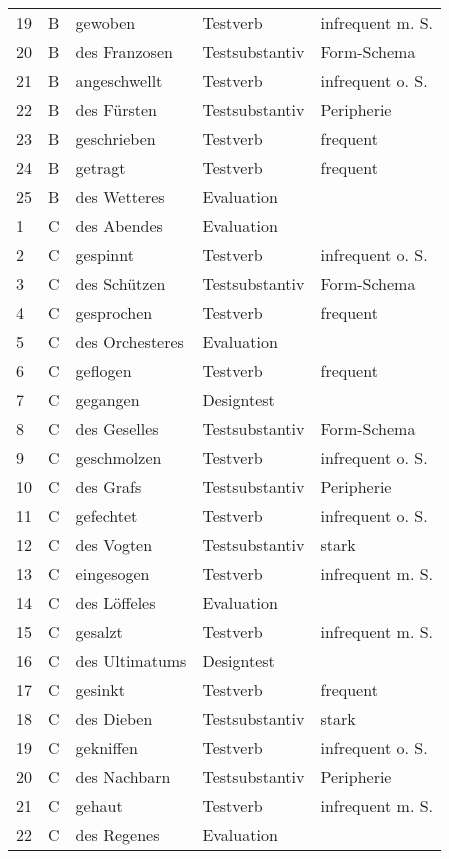 \begin{small}
\begin{longtable}{lllll}
  19 & B & gewoben & Testverb & infrequent m. S. \\ 
   20 & B & des Franzosen & Testsubstantiv & Form-Schema \\ 
   21 & B & angeschwellt & Testverb & infrequent o. S. \\ 
  22 & B & des Fürsten & Testsubstantiv & Peripherie \\ 
   23 & B & geschrieben & Testverb & frequent \\ 
  24 & B & getragt & Testverb & frequent \\ 
  25 & B & des Wetteres & Evaluation &  \\ 
	\midrule
  1 & C & des Abendes & Evaluation &  \\ 
 2 & C & gespinnt & Testverb & infrequent o. S. \\ 
   3 & C & des Schützen & Testsubstantiv & Form-Schema \\ 
   4 & C & gesprochen & Testverb & frequent \\ 
  5 & C & des Orchesteres & Evaluation &  \\ 
  6 & C & geflogen & Testverb & frequent \\ 
 7 & C & gegangen & Designtest &  \\ 
  8 & C & des Geselles & Testsubstantiv & Form-Schema \\ 
 9 & C & geschmolzen & Testverb & infrequent o. S. \\ 
  10 & C & des Grafs & Testsubstantiv & Peripherie \\ 
  11 & C & gefechtet & Testverb & infrequent o. S. \\ 
  12 & C & des Vogten & Testsubstantiv & stark \\ 
   13 & C & eingesogen & Testverb & infrequent m. S. \\ 
\midrule
14 & C & des Löffeles & Evaluation &  \\ 
  15 & C & gesalzt & Testverb & infrequent m. S. \\ 
 16 & C & des Ultimatums & Designtest &  \\ 
   17 & C & gesinkt & Testverb & frequent \\ 
   18 & C & des Dieben & Testsubstantiv & stark \\ 
  19 & C & gekniffen & Testverb & infrequent o. S. \\ 
 20 & C & des Nachbarn & Testsubstantiv & Peripherie \\ 
   21 & C & gehaut & Testverb & infrequent m. S. \\ 
  22 & C & des Regenes & Evaluation &  \\ 

\end{longtable}
\end{small}
